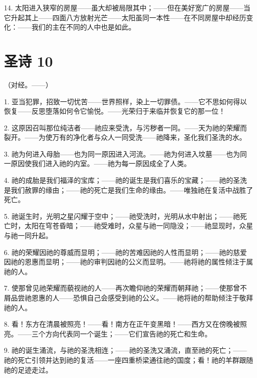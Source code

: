 14. 太阳进入狭窄的房屋——虽大却被局限其中；——但在美好宽广的房屋——当它升起其上——四面八方放射光芒——太阳虽同一本性——在不同房屋中却经历变化：——我们的主在不同的人中也是如此。\par


\section{圣诗 10}

（对经。——）\par

1. 亚当犯罪，招致一切忧苦——世界照样，染上一切罪债。——它不思如何得以恢复——反思堕落如何令它愉悦。——光荣归于来临并恢复它的那一位！\par

2. 这原因召叫那位纯洁者——祂应来受洗，与污秽者一同。——天为祂的荣耀而裂开。——为使万有的净化者与众人一同受洗——祂降来，圣化我们圣洗的水。\par

3. 祂为何进入母胎——也为同一原因进入河流。——祂为何进入坟墓——也为同一原因使我们进入祂的内室。——祂为每一原因成全了人类。\par

4. 祂的成胎是我们福泽的宝库；——祂的诞生是我们喜乐的宝藏；——祂的圣洗是我们赦罪的缘由；——祂的死亡是我们生命的缘由。——唯独祂在复活中战胜了死亡。\par

5. 祂诞生时，光明之星闪耀于空中；——祂受洗时，光明从水中射出；——祂死亡时，太阳在穹苍昏暗；——祂受难时，众星与祂一同隐没；——祂显现时，众星与祂一同升起。\par

6. 祂的荣耀因祂的尊威而显明；——祂的苦难因祂的人性而显明；——祂的慈爱因祂的恩惠而显明；——祂的审判因祂的公义而显明。——祂将祂的属性倾注于属祂的人。\par

7. 使那曾见祂荣耀而藐视祂的人——再次瞻仰祂的荣耀而朝拜祂；——使那曾不屑品尝祂恩惠的人——恐惧自己会感受到祂的公义。——祂将祂的帮助倾注于敬拜祂的人。\par

8. 看！东方在清晨被照亮！——看！南方在正午变黑暗！——西方又在傍晚被照亮。——三个方向代表同一个诞生；——它们宣告祂的死亡和生命。\par

9. 祂的诞生涌流，与祂的圣洗相连；——祂的圣洗又涌流，直至祂的死亡；——祂的死亡引领并达到祂的复活——一座四重桥梁通往祂的国度；看！祂的羊群跟随祂的足迹走过。\par

